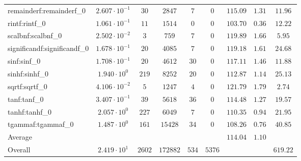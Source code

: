\begin{tabular}{|l|c|c|c|c|c|c|c|c|}
remainderf:remainderf\_0     & $ 2.607 \cdot 10^{-1} $ & $ 30     $ & $ 2847   $ & $ 7   $ & $ 0    $ & $ 115.09      $ & $ 1.31    $ & $ 11.96   $ \\
rintf:rintf\_0               & $ 1.061 \cdot 10^{-1} $ & $ 11     $ & $ 1514   $ & $ 0   $ & $ 0    $ & $ 103.70      $ & $ 0.36    $ & $ 12.22   $ \\
scalbnf:scalbnf\_0           & $ 2.502 \cdot 10^{-2} $ & $ 3      $ & $ 759    $ & $ 7   $ & $ 0    $ & $ 119.89      $ & $ 1.66    $ & $ 5.95    $ \\
significandf:significandf\_0 & $ 1.678 \cdot 10^{-1} $ & $ 20     $ & $ 4085   $ & $ 7   $ & $ 0    $ & $ 119.18      $ & $ 1.61    $ & $ 24.68   $ \\
sinf:sinf\_0                 & $ 1.708 \cdot 10^{-1} $ & $ 20     $ & $ 4612   $ & $ 30  $ & $ 0    $ & $ 117.11      $ & $ 1.46    $ & $ 11.88   $ \\
sinhf:sinhf\_0               & $ 1.940 \cdot 10^{0}  $ & $ 219    $ & $ 8252   $ & $ 20  $ & $ 0    $ & $ 112.87      $ & $ 1.14    $ & $ 25.13   $ \\
sqrtf:sqrtf\_0               & $ 4.106 \cdot 10^{-2} $ & $ 5      $ & $ 1247   $ & $ 4   $ & $ 0    $ & $ 121.79      $ & $ 1.79    $ & $ 2.74    $ \\
tanf:tanf\_0                 & $ 3.407 \cdot 10^{-1} $ & $ 39     $ & $ 5618   $ & $ 36  $ & $ 0    $ & $ 114.48      $ & $ 1.27    $ & $ 19.57   $ \\
tanhf:tanhf\_0               & $ 2.057 \cdot 10^{0}  $ & $ 227    $ & $ 6049   $ & $ 7   $ & $ 0    $ & $ 110.35      $ & $ 0.94    $ & $ 21.95   $ \\
tgammaf:tgammaf\_0           & $ 1.487 \cdot 10^{0}  $ & $ 161    $ & $ 15428  $ & $ 34  $ & $ 0    $ & $ 108.26      $ & $ 0.76    $ & $ 40.85   $ \\
\hline
Average                      & $                     $ & $        $ & $        $ & $     $ & $      $ & $ 114.04      $ & $ 1.10    $ & $         $ \\
\hline
Overall                      & $ 2.419 \cdot 10^{1}  $ & $ 2602   $ & $ 172882 $ & $ 534 $ & $ 5376 $ & $             $ & $         $ & $ 619.22  $ \\
\hline
\end{tabular}
